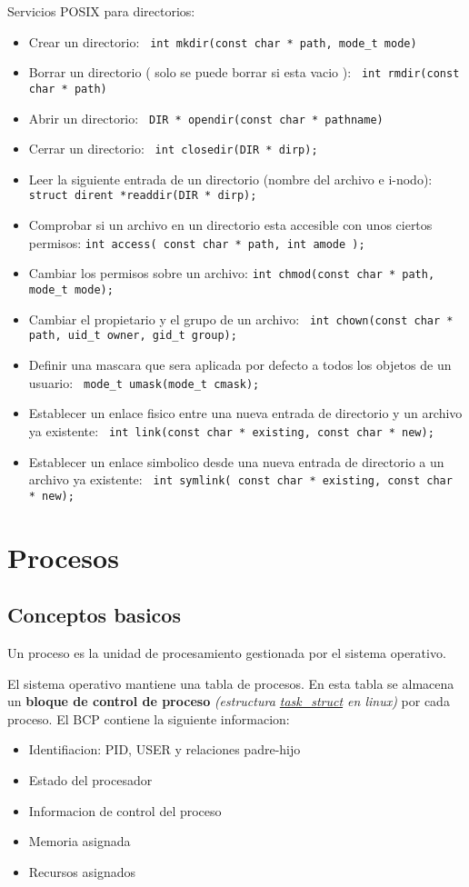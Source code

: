 \documentclass[12pt, letterpaper]{article}
\begin{document}
Servicios POSIX para directorios:
\begin{itemize}
	\item Crear un directorio: \texttt{ int mkdir(const char * path, mode\_t mode)}
	\item Borrar un directorio ( solo se puede borrar si esta vacio ): \texttt{ int rmdir(const char * path)}
	\item Abrir un directorio: \texttt{ DIR * opendir(const char * pathname)}
	\item Cerrar un directorio: \texttt{ int closedir(DIR * dirp);}
	\item Leer la siguiente entrada de un directorio (nombre del archivo e i-nodo): \texttt{struct dirent *readdir(DIR * dirp);}
	\item Comprobar si un archivo en un directorio esta accesible con unos ciertos permisos: \texttt{int access( const char * path, int amode );}
	\item Cambiar los permisos sobre un archivo: \texttt{int chmod(const char * path, mode\_t mode);}
	\item Cambiar el propietario y el grupo de un archivo: \texttt{ int chown(const char * path, uid\_t owner, gid\_t group);}
	\item Definir una mascara que sera aplicada por defecto a todos los objetos de un usuario: \texttt{ mode\_t umask(mode\_t cmask);}
	\item Establecer un enlace fisico entre una nueva entrada de directorio y un archivo ya existente: \texttt{ int link(const char * existing, const char * new);}
	\item Establecer un enlace simbolico desde una nueva entrada de directorio a un archivo ya existente: \texttt{ int symlink( const char * existing, const char * new);}
\end{itemize}

\section{Procesos}

\subsection{Conceptos basicos}
Un proceso es la unidad de procesamiento gestionada por el sistema operativo.\par
El sistema operativo mantiene una tabla de procesos. En esta tabla se almacena un \textbf{bloque de control de proceso} \textit{(estructura \href{https://github.com/torvalds/linux/blob/master/include/linux/sched.h}{task\_struct} en linux)} por cada proceso.
El BCP contiene la siguiente informacion:
\begin{itemize}
	\item{Identifiacion: PID, USER y relaciones padre-hijo}
	\item{Estado del procesador}
	\item{Informacion de control del proceso}
	\item{Memoria asignada}
	\item{Recursos asignados}
\end{itemize}
\end{document}
